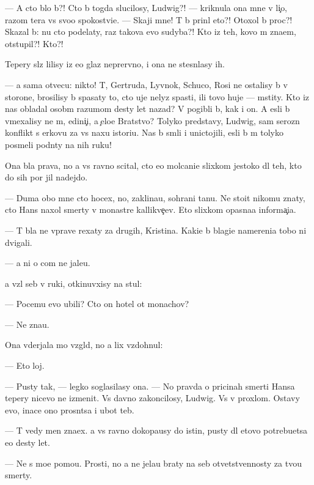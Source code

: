 \documentclass[10pt]{book}
\begin{document}
— A cto b{\yi}lo b{\yi}?! Cto b{\yi} togda slucilosy, Ludwig?! — kriknula ona mne v li{\c}o, razom ter{\ia}{\y}a vs{\e} svo{\y}o spoko{\y}stvi{\y}e. — Skaji mne! T{\yi} b{\yi} prin{\ia}l eto?! Otoxol b{\yi} proc?! Skazal b{\yi}: nu cto podelaty, raz takova {\y}evo sudyba?! Kto iz teh, kovo m{\yi} zna{\y}em, otstupil?! Kto?!

Tepery sl{\e}z{\yi} lilisy iz {\y}e{\y}o glaz neprer{\yi}vno, i ona ne stesn{\ia}lasy ih.

— {\Y}a sama otvecu: nikto! T{\yi}, Gertruda, Lyv{\e}nok, Schuco, Rosi ne ostalisy b{\yi} v storone, brosilisy b{\yi} spasaty to, cto uje nelyz{\ia} spasti, ili tovo huje — mstity. Kto iz nas obladal osob{\yi}m razumom des{\ia}ty let nazad? V{\yi} pogibli b{\yi}, kak i on. A {\y}esli b{\yi} vmexalisy ne m{\yi}, {\y}edini{\c}i, a {\c}elo{\y}e Bratstvo? Tolyko predstavy, Ludwig, sam{\yi}{\y} ser{\y}ozn{\yi}{\y} konflikt s {\C}erkov{\y}u za vs{\io} naxu istori{\y}u. Nas b{\yi} sm{\ia}li i unictojili, {\y}esli b{\yi} m{\yi} tolyko posmeli podn{\ia}ty na nih ruku!

Ona b{\yi}la prava, no {\y}a vs{\e} ravno scital, cto {\y}e{\y}o molcani{\y}e slixkom jestoko dl{\ia} teh, kto do sih por jil nadejdo{\y}.

— Duma{\y} obo mne cto hocex, no, zaklina{\y}u, sohrani ta{\y}nu. Ne stoit nikomu znaty, cto Hans naxol smerty v monast{\yi}re kallikve{\c}ev. Eto slixkom opasna{\y}a informa{\c}i{\y}a.

— T{\yi} b{\yi}la ne vprave rexaty za drugih, Kristina. Kaki{\y}e b{\yi} blagi{\y}e namereni{\y}a tobo{\y} ni dvigali.

— {\Y}a ni o com ne jale{\y}u.

{\Y}a vz{\ia}l seb{\ia} v ruki, otkinuvxisy na stul:

— Po\-ce\-mu {\y}evo ubili? Cto on hotel ot monachov?

— Ne zna{\y}u.

Ona v{\yi}derjala mo{\y} vzgl{\ia}d, no {\y}a lix vzdohnul:

— Eto loj.

— Pusty tak, — legko soglasilasy ona. — No pravda o pricinah smerti Hansa tepery nicevo ne izmenit. Vs{\e} davno zakoncilosy, Ludwig. Vs{\e} v proxlom. Ostavy {\y}evo, inace ono prosn{\e}tsa i ub{\y}ot teb{\ia}.

— T{\yi} vedy men{\ia} zna\-{\y}ex. {\Y}a vs{\e} ravno dokopa{\y}usy do istin{\yi}, pusty dl{\ia} etovo potrebu{\y}etsa {\y}e{\x}o des{\ia}ty let.

— Ne s mo{\y}e{\y} pomo{\x}{\y}u. Prosti, no {\y}a ne jela{\y}u braty na seb{\ia} otvetstvennosty za tvo{\y}u smerty.
\end{document}
